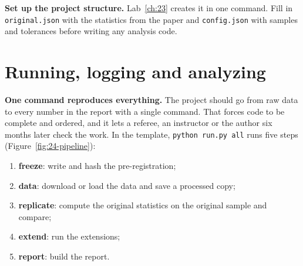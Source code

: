 {\sloppy \textbf{Set up the project structure.} Lab~\ref{ch:23} creates it in one command. Fill in \texttt{original.json} with the statistics from the paper and \texttt{config.json} with samples and tolerances before writing any analysis code.\par}

\section{Running, logging and analyzing}
\label{sec:24-running}

\textbf{One command reproduces everything.} The project should go from raw data to every number in the report with a single command. That forces code to be complete and ordered, and it lets a referee, an instructor or the author six months later check the work. In the template, \texttt{python run.py all} runs five steps (Figure~\ref{fig:24-pipeline}):

\begin{enumerate}
  \item \textbf{freeze}: write and hash the pre-registration;
  \item \textbf{data}: download or load the data and save a processed copy;
  \item \textbf{replicate}: compute the original statistics on the original sample and compare;
  \item \textbf{extend}: run the extensions;
  \item \textbf{report}: build the report.
\end{enumerate}

